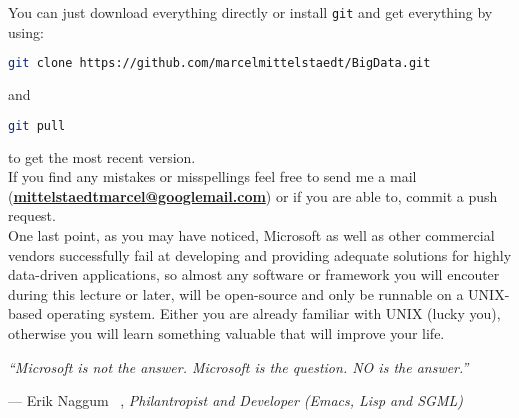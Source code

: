 You can just download everything directly or install \lstinline{git} and get everything by using:
\begin{lstlisting}[language=bash,frame=none,numbers=none,xleftmargin=0.05\textwidth,xrightmargin=0.05\textwidth]
 git clone https://github.com/marcelmittelstaedt/BigData.git
\end{lstlisting}
and 
\begin{lstlisting}[language=bash,frame=none,numbers=none,xleftmargin=0.05\textwidth,xrightmargin=0.05\textwidth]
 git pull
\end{lstlisting}
to get the most recent version.\\

If you find any mistakes or misspellings feel free to send me a mail\\
(\textbf{\href{mailto:mittelstaedtmarcel@googlemail.com}{mittelstaedtmarcel@googlemail.com}})
or if you are able to, commit a push request.\\

One last point, as you may have noticed, Microsoft as well as other commercial vendors successfully fail at developing and providing adequate solutions for highly data-driven applications, so almost any software or framework you will encouter during this lecture or later, will be open-source and only be runnable on a UNIX-based operating system. Either you are already familiar with UNIX (lucky you), otherwise you will learn something valuable that will improve your life.\\

\setlength{\epigraphwidth}{0.9\textwidth}
\setlength\epigraphrule{0pt}
\epigraph{\itshape ``Microsoft is not the answer. Microsoft is the question. NO is the answer.''}{--- Erik Naggum \gtrsymDied~, \textit{Philantropist and Developer (Emacs, Lisp and SGML) }}


